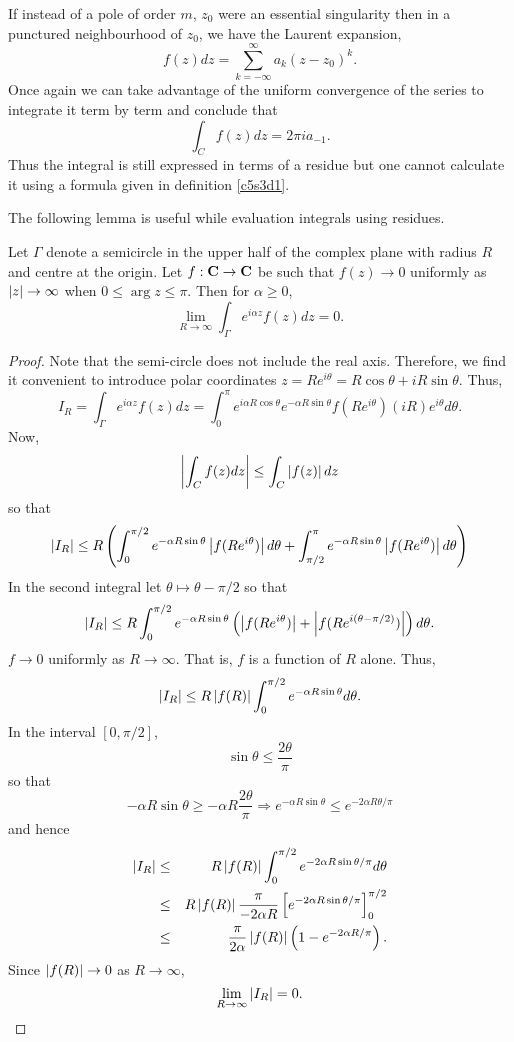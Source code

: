 If instead of a pole of order $m$, $z_0$ were an essential singularity then
in a punctured neighbourhood of $z_0$, we have the Laurent expansion,
\[
f(z)dz = \sum_{k=-\infty}^\infty a_k(z - z_0)^k.
\]
Once again we can take advantage of the uniform convergence of the series to
integrate it term by term and conclude that
\begin{equation}\label{c5s3e5}
\int_C f(z)dz = 2\pi i a_{-1}.
\end{equation} 
Thus the integral is still expressed in terms of a residue but one cannot 
calculate it using a formula given in definition \ref{c5s3d1}.

The following lemma is useful while evaluation integrals using residues.
\begin{lem}\label{c5s3l1}
Let $\Gamma$ denote a semicircle in the upper half of the complex plane with
radius $R$ and centre at the origin. Let $f:\mathbf{C} \rightarrow \mathbf{C}$ be such that
$f(z) \rightarrow 0$ uniformly as $\left\vert{z}\right\vert \rightarrow \infty$ when $0 \le \arg{z} 
\le \pi$. Then for $\alpha \ge 0$,
\[
\lim_{R \rightarrow \infty}\int_\Gamma e^{i\alpha z}f(z)dz = 0.
\]
\end{lem}
\begin{proof}
Note that the semi-circle does not include the real axis. Therefore, we find it
convenient to introduce polar coordinates $z = Re^{i\theta} = R\cos\theta + iR
\sin\theta$. Thus,
\[
I_R = \int_\Gamma e^{i\alpha z}f(z)dz = \int_0^\pi e^{i\alpha R\cos\theta}
e^{-\alpha R\sin\theta}f(Re^{i\theta})(iR)e^{i\theta}d\theta.
\]
Now,
\[
\left\vert{\int_C f(z)dz}\right\vert \le \int_C\left\vert{f(z)}\right\vert dz
\]
so that
\[
\left\vert{I_R}\right\vert \le R\left(
\int_0^{\pi/2} e^{-\alpha R\sin\theta}\left\vert{f(Re^{i\theta})}\right\vert d\theta + 
\int_{\pi/2}^\pi e^{-\alpha R\sin\theta}\left\vert{f(Re^{i\theta})}\right\vert d\theta\right)
\] 
In the second integral let $\theta \mapsto \theta - \pi/2$ so that
\[
\left\vert{I_R}\right\vert \le R\int_0^{\pi/2} e^{-\alpha R\sin\theta}\left(\left\vert{f(Re^{i\theta})}\right\vert
+ \left\vert{f(Re^{i(\theta-\pi/2)})}\right\vert\right)d\theta.
\]
$f \rightarrow 0$ uniformly as $R \rightarrow \infty$. That is, $f$ is a 
function of $R$ alone. Thus,
\[
\left\vert{I_R}\right\vert \le R\left\vert{f(R)}\right\vert \int_0^{\pi/2} e^{-\alpha R\sin\theta} d\theta.
\]
In the interval $[0, \pi/2]$, 
\[
\sin\theta \le \frac{2\theta}{\pi}
\]
so that 
\[
-\alpha R\sin\theta \ge -\alpha R \frac{2\theta}{\pi} \Rightarrow
e^{-\alpha R\sin\theta} \le e^{-2\alpha R\theta/\pi}
\]
and hence
\begin{eqnarray*}
\left\vert{I_R}\right\vert &\le& R\left\vert{f(R)}\right\vert \int_0^{\pi/2} e^{-2\alpha R\sin\theta/\pi} d\theta \\
&\le& R\left\vert{f(R)}\right\vert\frac{\pi}{-2\alpha R} \left[e^{-2\alpha R\sin\theta/\pi}\right]_0^{\pi/2} \\
&\le& \frac{\pi}{2\alpha}\left\vert{f(R)}\right\vert\left(1 - e^{-2\alpha R/\pi}\right).
\end{eqnarray*}
Since $\left\vert{f(R)}\right\vert \rightarrow 0$ as $R \rightarrow \infty$,
\[
\lim_{R \rightarrow \infty}\left\vert{I_R}\right\vert = 0.
\]
\end{proof}

